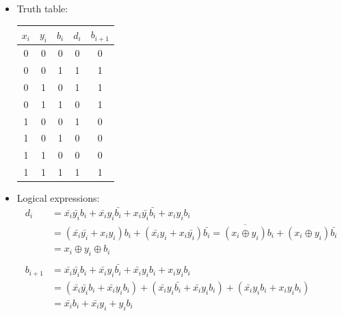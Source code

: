 \documentclass[12pt,openany]{book}
\begin{document}
			      	\begin{itemize}
			      		
			      		\item[] Truth table: \newline \vspace*{10px}
			      		      \begin{tabular}{ccc|cc}
			      		      	\hline
			      		      	$x_i$ & $y_i$ & $b_i$ & $d_i$ & $b_{i+1}$ \\
			      		      	\hline
			      		      	0     & 0     & 0     & 0     & 0         \\
			      		      	0     & 0     & 1     & 1     & 1         \\
			      		      	0     & 1     & 0     & 1     & 1         \\
			      		      	0     & 1     & 1     & 0     & 1         \\
			      		      	1     & 0     & 0     & 1     & 0         \\
			      		      	1     & 0     & 1     & 0     & 0         \\
			      		      	1     & 1     & 0     & 0     & 0         \\
			      		      	1     & 1     & 1     & 1     & 1         \\
			      		      	\hline
			      		      \end{tabular}
			      		      
			      		      
			      		      
			      		\item[]Logical expressions:
			      		      \begin{align*}
			      		      	d_i     & = \bar{x_i}\bar{y_i} b_i + \bar{x_i} y_i \bar{b_i} + x_i \bar{y_i} \bar{b_i} + x_i y_i b_i                                                       \\
			      		      	        & = (\bar{x_i} \bar{y_i} + x_i y_i) b_i + (\bar{x_i} y_i + x_i \bar{y_i}) \bar{b_i} = \overline{(x_i \oplus y_i)} b_i + (x_i \oplus y_i) \bar{b_i} \\
			      		      	        & = x_i \oplus y_i \oplus b_i                                                                                                                      \\
			      		      	\\
			      		      	b_{i+1} & = \bar{x_i} \bar{y_i} b_i +\bar{x_i} y_i \bar{b_i} + \bar{x_i} y_i b_i + x_i y_i b_i                                                             \\
			      		      	        & = (\bar{x_i} \bar{y_i} b_i + \bar{x_i} y_i b_i) + (\bar{x_i} y_i \bar{b_i} + \bar{x_i} y_i b_i) + (\bar{x_i}y_ib_i + x_iy_ib_i)                  \\
			      		      	        & = \bar{x_i} b_i + \bar{x_i} y_i + y_i b_i                                                                                                        \\
			      		      \end{align*}
			      		      

\end{itemize}
\end{document}

